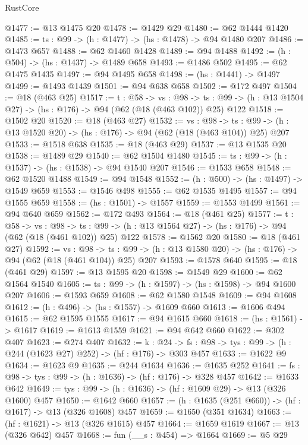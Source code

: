 \begin{lexlean}{RustCore}
\begin{coremodule}
@1477 := @13 @1475 @20
@1478 := @1429 @29
@1480 := @62 @1444 @1420
@1485 := {ts : @99} -> (h : @1477) -> (hs : @1478) -> @94 @1480 @207
@1486 := @1473 @657
@1488 := @62 @1460 @1428
@1489 := @94 @1488
@1492 := (h : @504) -> (hs : @1437) -> @1489 @658
@1493 := @1486 @502
@1495 := @62 @1475 @1435
@1497 := @94 @1495 @658
@1498 := (hs : @1441) -> @1497
@1499 := @1493 @1439
@1501 := @94 @638 @658
@1502 := @172 @497
@1504 := @18 (@463 @25)
@1517 := {t : @58} ->
  {vs : @98} ->
  {ts : @99} -> (h : @13 @1504 @27) -> (hs : @176) -> @94 (@62 (@18 (@463 @102)) @25) @122
@1518 := @1502 @20
@1520 := @18 (@463 @27)
@1532 := {vs : @98} ->
  {ts : @99} -> (h : @13 @1520 @20) -> (hs : @176) -> @94 (@62 (@18 (@463 @104)) @25) @207
@1533 := @1518 @638
@1535 := @18 (@463 @29)
@1537 := @13 @1535 @20
@1538 := @1489 @29
@1540 := @62 @1504 @1480
@1545 := {ts : @99} -> (h : @1537) -> (hs : @1538) -> @94 @1540 @207
@1546 := @1533 @658
@1548 := @62 @1520 @1488
@1549 := @94 @1548
@1552 := (h : @500) -> (hs : @1497) -> @1549 @659
@1553 := @1546 @498
@1555 := @62 @1535 @1495
@1557 := @94 @1555 @659
@1558 := (hs : @1501) -> @1557
@1559 := @1553 @1499
@1561 := @94 @640 @659
@1562 := @172 @493
@1564 := @18 (@461 @25)
@1577 := {t : @58} ->
  {vs : @98} ->
  {ts : @99} -> (h : @13 @1564 @27) -> (hs : @176) -> @94 (@62 (@18 (@461 @102)) @25) @122
@1578 := @1562 @20
@1580 := @18 (@461 @27)
@1592 := {vs : @98} ->
  {ts : @99} -> (h : @13 @1580 @20) -> (hs : @176) -> @94 (@62 (@18 (@461 @104)) @25) @207
@1593 := @1578 @640
@1595 := @18 (@461 @29)
@1597 := @13 @1595 @20
@1598 := @1549 @29
@1600 := @62 @1564 @1540
@1605 := {ts : @99} -> (h : @1597) -> (hs : @1598) -> @94 @1600 @207
@1606 := @1593 @659
@1608 := @62 @1580 @1548
@1609 := @94 @1608
@1612 := (h : @496) -> (hs : @1557) -> @1609 @660
@1613 := @1606 @494
@1615 := @62 @1595 @1555
@1617 := @94 @1615 @660
@1618 := (hs : @1561) -> @1617
@1619 := @1613 @1559
@1621 := @94 @642 @660
@1622 := @302 @407
@1623 := @274 @407
@1632 := {k : @24} ->
  {fs : @98} -> {tys : @99} -> (h : @244 (@1623 @27) @252) -> (hf : @176) -> @303 @457
@1633 := @1622 @9
@1634 := @1623 @9
@1635 := @244 @1634
@1636 := @1635 @252
@1641 := {fs : @98} -> {tys : @99} -> (h : @1636) -> (hf : @176) -> @328 @457
@1642 := @1633 @642
@1649 := {tys : @99} -> (h : @1636) -> (hf : @1609 @29) -> @13 (@326 @1600) @457
@1650 := @1642 @660
@1657 := (h : @1635 (@251 @660)) -> (hf : @1617) -> @13 (@326 @1608) @457
@1659 := @1650 (@351 @1634)
@1663 := (hf : @1621) -> @13 (@326 @1615) @457
@1664 := @1659 @1619
@1667 := @13 (@326 @642) @457
@1668 := fun (__s : @454) => @1664
@1669 := @5 @29

\end{coremodule}
\end{lexlean}

